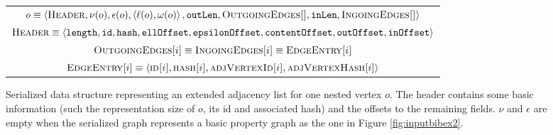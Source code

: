 



\begin{figure*}[!ht]
	
\begin{tabular}{c}
	{$o\equiv\Braket{\textsc{Header},\nu(o),\epsilon(o),\Braket{\ell(o),\omega(o)},\texttt{outLen},\textsc{OutgoingEdges[]},\texttt{inLen},\textsc{IngoingEdges[]}}$} \\
	{$\textsc{Header}\equiv\Braket{\texttt{length},\texttt{id},\texttt{hash},\texttt{ellOffset},\texttt{epsilonOffset},\texttt{contentOffset},\texttt{outOffset},\texttt{inOffset}}$}\\
	$\textsc{OutgoingEdges[}i\textsc{]}\equiv\textsc{IngoingEdges[}i\textsc{]}\equiv \textsc{EdgeEntry[}i\textsc{]}$ \\ $\textsc{EdgeEntry[}i\textsc{]}\equiv\Braket{\textsc{id[}i\textsc{]},\textsc{hash[}i\textsc{]},\textsc{adjVertexId[}i\textsc{]},\textsc{adjVertexHash[}i\textsc{]}}$\\
\end{tabular}
	\caption{Serialized data structure representing an extended adjacency list for one nested vertex $o$. The header contains some basic information (such the representation size of $o$, its id and associated hash) and the offsets to the remaining fields. $\nu$ and $\epsilon$ are empty when the serialized graph represents a basic property graph as the one in Figure \ref{fig:inputbibex2}.}\label{nestedGraphVertex}
\end{figure*}
